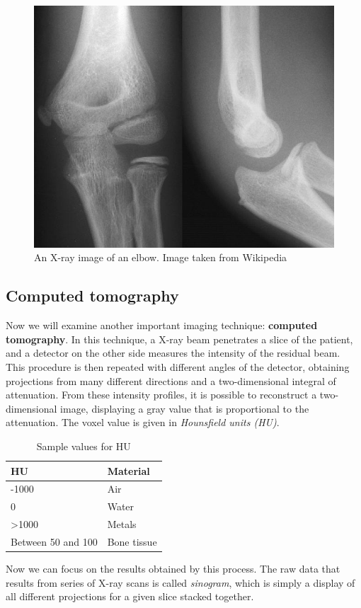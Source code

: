 \begin{figure}[htb] %
   \centering
   \includegraphics[height=0.25\linewidth]{images/x-ray.png}
   \caption[X-ray image]{An X-ray image of an elbow. Image taken from Wikipedia}
   \label{fig:xRay}
\end{figure}


\subsection{Computed tomography}

Now we will examine another important imaging technique: \textbf{computed tomography}. In this technique, a X-ray beam penetrates a slice of the patient, and a detector on the other side measures the intensity of the residual beam. This procedure is then repeated with different angles of the detector, obtaining projections from many different directions and a two-dimensional integral of attenuation. From these intensity profiles, it is possible to reconstruct a two-dimensional image, displaying a gray value that is proportional to the attenuation. The voxel value is given in \textit{Hounsfield units (HU)}.

\begin{table}[htbp]
\centering
\caption{Sample values for HU}
\label{tbl:Hounsfield}
\begin{tabular}{@{}ll@{}}
\toprule
\textbf{HU}        & \textbf{Material}   \\ \midrule
-1000              & Air         \\
0                  & Water       \\
\textgreater1000   & Metals      \\
Between 50 and 100 & Bone tissue \\
\bottomrule
\end{tabular}
\end{table}

Now we can focus on the results obtained by this process. The raw data that results from series of X-ray scans is called \textit{sinogram}, which is simply a display of all different projections for a given slice stacked together.

